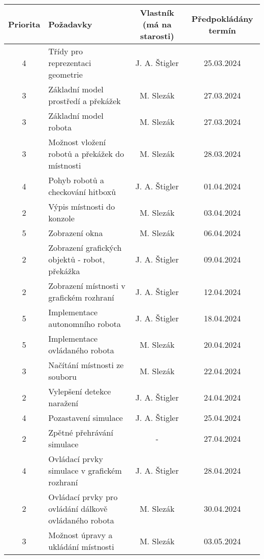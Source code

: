 \documentclass{article}
\begin{document}
\begin{table}[h]
    \centering
    \begin{tabular}{ |c|>{\raggedright\arraybackslash}p{4cm}|c|c| }
        \hline
        \rowcolor{blue!25}Priorita & Požadavky & Vlastník (má na starosti) &
        Předpokládány termín \\
        \hline
        \rowcolor{green!25}4 & Třídy pro reprezentaci geometrie &
            J. A. Štigler & 25.03.2024 \\
        \hline
        \rowcolor{green!25}3 & Základní model prostředí a překážek &
            M. Slezák & 27.03.2024 \\
        \hline
        \rowcolor{green!25}3 & Základní model robota & M. Slezák &
            27.03.2024 \\
        \hline
        \rowcolor{green!25}3 & Možnost vložení robotů a překážek do místnosti &
            M. Slezák & 28.03.2024 \\
        \hline
        \rowcolor{green!25}4 & Pohyb robotů a checkování hitboxů &
            J. A. Štigler & 01.04.2024 \\
        \hline
        \rowcolor{green!25}2 & Výpis místnosti do konzole & M. Slezák &
        03.04.2024 \\
        \hline
        5 & Zobrazení okna & M. Slezák & 06.04.2024 \\
        \hline
        2 & Zobrazení grafických objektů - robot, překážka & J. A. Štigler &
        09.04.2024 \\
        \hline
        2 & Zobrazení místnosti v grafickém rozhraní & J. A. Štigler &
        12.04.2024 \\
        \hline
        5 & Implementace autonomního robota & J. A. Štigler & 18.04.2024 \\
        \hline
        5 & Implementace ovládaného robota & M. Slezák & 20.04.2024 \\
        \hline
        3 & Načítání místnosti ze souboru & M. Slezák & 22.04.2024 \\
        \hline
        2 & Vylepšení detekce naražení & J. A. Štigler & 24.04.2024 \\
        \hline
        4 & Pozastavení simulace & J. A. Štigler & 25.04.2024 \\
        \hline
        \rowcolor{red!25}2 & Zpětné přehrávání simulace & - & 27.04.2024 \\
        \hline
        4 & Ovládací prvky simulace v grafickém rozhraní & J. A. Štigler &
            28.04.2024 \\
        \hline
        2 & Ovládací prvky pro ovládání dálkově ovládaného robota &
            M. Slezák & 30.04.2024 \\
        \hline
        3 & Možnost úpravy a ukládání místnosti & M. Slezák & 03.05.2024 \\
        \hline
    \end{tabular}
\end{table}
\end{document}
